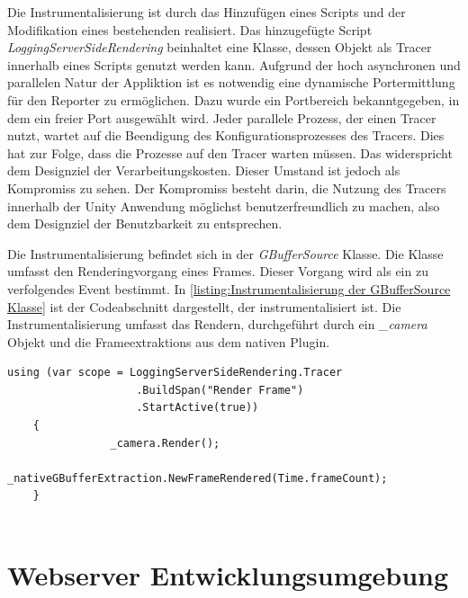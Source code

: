 Die Instrumentalisierung ist durch das Hinzufügen eines Scripts und der Modifikation eines bestehenden realisiert.
Das hinzugefügte Script \emph{LoggingServerSideRendering} beinhaltet eine Klasse, dessen Objekt als Tracer innerhalb eines Scripts genutzt werden kann.
Aufgrund der hoch asynchronen und parallelen Natur der Appliktion ist es notwendig eine dynamische Portermittlung für den Reporter zu ermöglichen.
Dazu wurde ein Portbereich bekanntgegeben, in dem ein freier Port ausgewählt wird.
Jeder parallele Prozess, der einen Tracer nutzt, wartet auf die Beendigung des Konfigurationsprozesses des Tracers.
Dies hat zur Folge, dass die Prozesse auf den Tracer warten müssen.
Das widerspricht dem Designziel der Verarbeitungskosten. Dieser Umstand ist jedoch als Kompromiss zu sehen. Der Kompromiss besteht darin, die Nutzung des Tracers innerhalb der Unity Anwendung möglichst benutzerfreundlich zu machen, also dem Designziel der Benutzbarkeit zu entsprechen.

Die Instrumentalisierung befindet sich in der \emph{GBufferSource} Klasse.
Die Klasse umfasst den Renderingvorgang eines Frames. 
Dieser Vorgang wird als ein zu verfolgendes Event bestimmt.
In \cref{listing:Instrumentalisierung der GBufferSource Klasse} ist der Codeabschnitt dargestellt, der instrumentalisiert ist.
Die Instrumentalisierung umfasst das Rendern, durchgeführt durch ein \emph{\_camera} Objekt und die Frameextraktions aus dem nativen Plugin.


\begin{minipage}[]{\textwidth}
	\begin{lstlisting}[frame=trBL]
	using (var scope = LoggingServerSideRendering.Tracer
					.BuildSpan("Render Frame")
					.StartActive(true))
	{
				_camera.Render();
				_nativeGBufferExtraction.NewFrameRendered(Time.frameCount);
	}
	
	\end{lstlisting}
	\label{listing:Instrumentalisierung der GBufferSource Klasse}
\end{minipage}

\section{ Webserver Entwicklungsumgebung }
\label{section:Webserver Entwicklungsumgebung}

